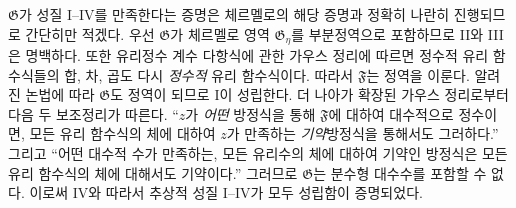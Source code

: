
$\mathfrak G$가 성질 I--IV를 만족한다는 증명은 체르멜로의 해당 증명과 정확히 나란히 진행되므로 간단히만 적겠다. 우선 $\mathfrak G$가 체르멜로 영역 $\mathfrak G_\eta$를 부분정역으로 포함하므로 II와 III은 명백하다. 또한 유리정수 계수 다항식에 관한 가우스 정리에 따르면 정수적 유리 함수식들의 합, 차, 곱도 다시 \emph{정수적} 유리 함수식이다. 따라서 $\mathfrak F$는 정역을 이룬다. 알려진 논법에 따라 $\mathfrak G$도 정역이 되므로 I이 성립한다. 더 나아가 확장된 가우스 정리로부터 다음 두 보조정리가 따른다. ``$z$가 \emph{어떤} 방정식을 통해 $\mathfrak F$에 대하여 대수적으로 정수이면, 모든 유리 함수식의 체에 대하여 $z$가 만족하는 \emph{기약}방정식을 통해서도 그러하다.'' 그리고 ``어떤 대수적 수가 만족하는, 모든 유리수의 체에 대하여 기약인 방정식은 모든 유리 함수식의 체에 대해서도 기약이다.'' 그러므로 $\mathfrak G$는 분수형 대수수를 포함할 수 없다. 이로써 IV와 따라서 추상적 성질 I--IV가 모두 성립함이 증명되었다.
